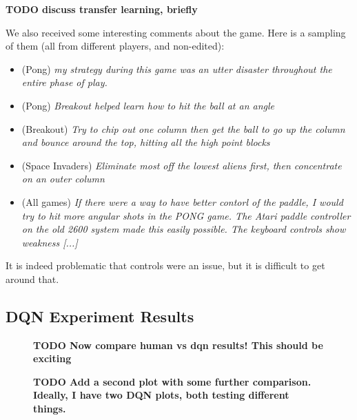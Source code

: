 \documentclass[letterpaper, 10 pt, conference]{ieeeconf}  %
\begin{document}
\textbf{TODO discuss transfer learning, briefly}

We also received some interesting comments about the game. Here is a sampling of them (all from
different players, and non-edited):

\begin{itemize}
    \item (Pong) \emph{my strategy during this game was an utter disaster throughout the entire
    phase of play.}
    \item (Pong) \emph{Breakout helped learn how to hit the ball at an angle}
    \item (Breakout) \emph{Try to chip out one column then get the ball to go up the column and
    bounce around the top, hitting all the high point blocks}
    \item (Space Invaders) \emph{Eliminate most off the lowest aliens first, then concentrate on an
    outer column}
    \item (All games) \emph{If there were a way to have better contorl of the paddle, I would try to
    hit more angular shots in the PONG game. The Atari paddle controller on the old 2600 system made
    this easily possible. The keyboard controls show weakness [...]}
\end{itemize}

It is indeed problematic that controls were an issue, but it is difficult to get around that.

\subsection{DQN Experiment Results}\label{ssec:dqn_results}

\begin{figure}[t]
\begin{center}
\fbox{\rule[-.5cm]{0cm}{4cm} \rule[-.5cm]{4cm}{0cm}}
\end{center}
\caption{\textbf{TODO Now compare human vs dqn results! This should be exciting}}
\label{fig:dqn_1}
\end{figure}

\begin{figure}[t]
\begin{center}
\fbox{\rule[-.5cm]{0cm}{4cm} \rule[-.5cm]{4cm}{0cm}}
\end{center}
\caption{\textbf{TODO Add a second plot with some further comparison. Ideally, I have two DQN plots,
both testing different things.}}
\label{fig:dqn_2}
\end{figure}
\end{document}
